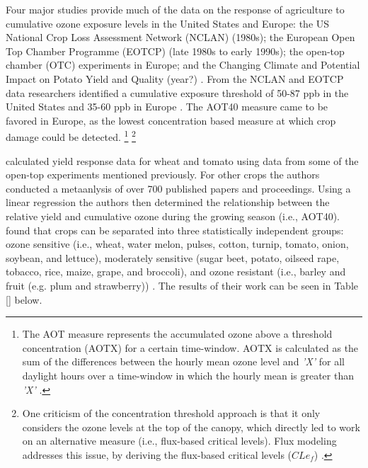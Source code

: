 \documentclass[10pt]{amsart}
\begin{document}
Four major studies provide much of the data on the response of agriculture to cumulative ozone exposure levels in the United States and Europe: the US National Crop Loss Assessment Network (NCLAN) (1980s); the European Open Top Chamber Programme (EOTCP) (late 1980s to early 1990s); the open-top chamber (OTC) experiments in Europe; and the Changing Climate and Potential Impact on Potato Yield and Quality (year?) \parencite{mills:2007aa}. 
From the NCLAN and EOTCP data researchers identified a cumulative exposure threshold of 50-87 ppb in the United States and 35-60 ppb in Europe \parencite{mills:2007aa}.
The AOT40 measure came to be favored in Europe, as the lowest concentration based measure at which crop damage could be detected. \footnote{The AOT measure represents the accumulated ozone above a threshold concentration (AOTX) for a certain time-window. 
AOTX is calculated as the sum of the differences between the hourly mean ozone level and \textit{'X'} for all daylight hours over a time-window in which the hourly mean is greater than \textit{'X'} \parencite{mills:2007aa}.}
\footnote{One criticism of the concentration threshold approach is that it only considers the ozone levels at the top of the canopy, which directly led to work on an alternative measure (i.e., flux-based critical levels).
Flux modeling addresses this issue, by deriving the flux-based critical levels ($CLe_{f}$) \parencite{mills:2007aa}.}
 
\cite{mills:2007aa} calculated yield response data for wheat and tomato using data from some of the open-top experiments mentioned previously.
For other crops the authors conducted a metaanlysis of over 700 published papers and proceedings.
Using a linear regression the authors then determined the relationship between the relative yield and cumulative ozone during the growing season (i.e., AOT40).
\cite{mills:2007aa} found that crops can be separated into three statistically independent groups: ozone sensitive (i.e., wheat, water melon, pulses, cotton, turnip, tomato, onion, soybean, and lettuce), moderately sensitive (sugar beet, potato, oilseed rape, tobacco, rice, maize, grape, and broccoli), and ozone resistant (i.e., barley and fruit (e.g. plum and strawberry)) \parencite{mills:2007aa}. 
The results of their work can be seen in Table \ref{} below.  
\end{document}
